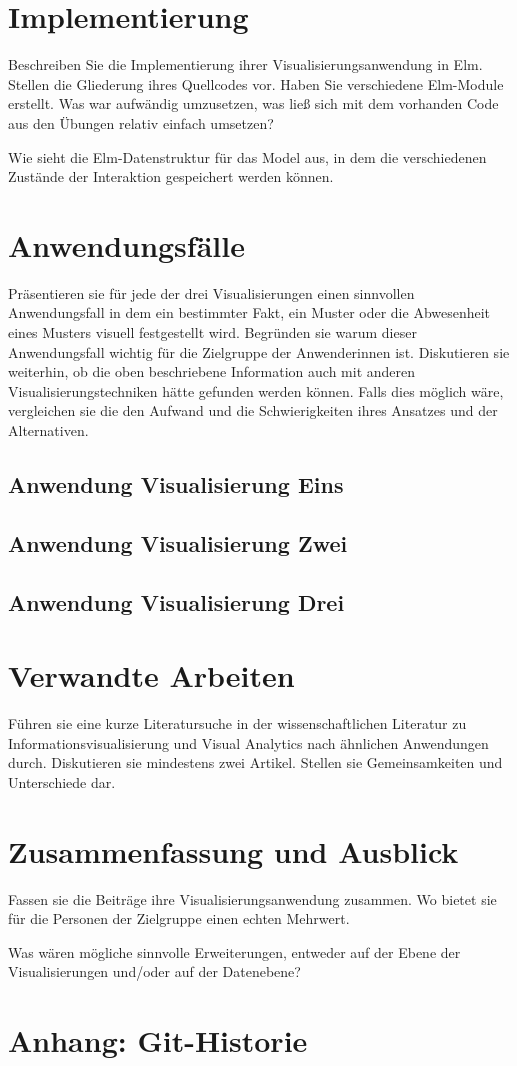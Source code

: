 \documentclass[usegeometry=true]{scrartcl}
\begin{document}
\section{Implementierung}
Beschreiben Sie die Implementierung ihrer Visualisierungsanwendung in Elm. Stellen die Gliederung ihres Quellcodes vor. Haben Sie verschiedene Elm-Module erstellt. Was war aufwändig umzusetzen, was ließ sich mit dem vorhanden Code aus den Übungen relativ einfach umsetzen? 

Wie sieht die Elm-Datenstruktur für das Model aus, in dem die verschiedenen Zustände der Interaktion gespeichert werden können.

\section{Anwendungsfälle}
Präsentieren sie für jede der drei Visualisierungen einen sinnvollen Anwendungsfall in dem ein bestimmter Fakt, ein Muster oder die Abwesenheit eines Musters visuell festgestellt wird. Begründen sie warum dieser Anwendungsfall wichtig für die Zielgruppe der Anwenderinnen ist. Diskutieren sie weiterhin, ob die oben beschriebene Information auch mit anderen Visualisierungstechniken hätte gefunden werden können. Falls dies möglich wäre, vergleichen sie die den Aufwand und die Schwierigkeiten ihres Ansatzes und der Alternativen. 
\subsection{Anwendung Visualisierung Eins}
\subsection{Anwendung Visualisierung Zwei}
\subsection{Anwendung Visualisierung Drei}

\section{Verwandte Arbeiten}
Führen sie eine kurze Literatursuche in der wissenschaftlichen Literatur zu Informationsvisualisierung und Visual Analytics nach ähnlichen Anwendungen durch. Diskutieren sie mindestens zwei Artikel. Stellen sie Gemeinsamkeiten und Unterschiede dar.

\section{Zusammenfassung und Ausblick}
Fassen sie die Beiträge ihre Visualisierungsanwendung zusammen. Wo bietet sie für die Personen der Zielgruppe einen echten Mehrwert.

Was wären mögliche sinnvolle Erweiterungen, entweder auf der Ebene der Visualisierungen und/oder auf der Datenebene?

\section*{Anhang: Git-Historie}

\printbibliography
\end{document}
